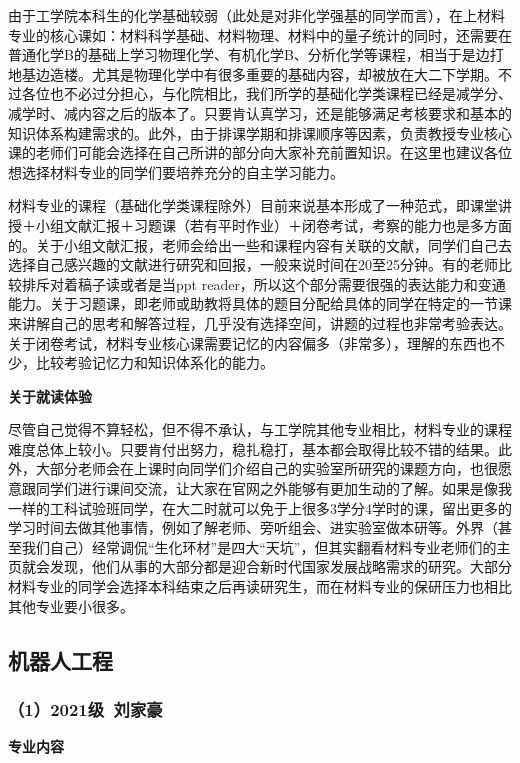 \vspace{10pt}

由于工学院本科生的化学基础较弱（此处是对非化学强基的同学而言），在上材料专业的核心课如：材料科学基础、材料物理、材料中的量子统计的同时，还需要在普通化学B的基础上学习物理化学、有机化学B、分析化学等课程，相当于是边打地基边造楼。尤其是物理化学中有很多重要的基础内容，却被放在大二下学期。不过各位也不必过分担心，与化院相比，我们所学的基础化学类课程已经是减学分、减学时、减内容之后的版本了。只要肯认真学习，还是能够满足考核要求和基本的知识体系构建需求的。此外，由于排课学期和排课顺序等因素，负责教授专业核心课的老师们可能会选择在自己所讲的部分向大家补充前置知识。在这里也建议各位想选择材料专业的同学们要培养充分的自主学习能力。

\vspace{10pt}

材料专业的课程（基础化学类课程除外）目前来说基本形成了一种范式，即课堂讲授＋小组文献汇报＋习题课（若有平时作业）＋闭卷考试，考察的能力也是多方面的。关于小组文献汇报，老师会给出一些和课程内容有关联的文献，同学们自己去选择自己感兴趣的文献进行研究和回报，一般来说时间在20至25分钟。有的老师比较排斥对着稿子读或者是当ppt reader，所以这个部分需要很强的表达能力和变通能力。关于习题课，即老师或助教将具体的题目分配给具体的同学在特定的一节课来讲解自己的思考和解答过程，几乎没有选择空间，讲题的过程也非常考验表达。关于闭卷考试，材料专业核心课需要记忆的内容偏多（非常多），理解的东西也不少，比较考验记忆力和知识体系化的能力。

\vspace{10pt}

\textbf{关于就读体验}

尽管自己觉得不算轻松，但不得不承认，与工学院其他专业相比，材料专业的课程难度总体上较小。只要肯付出努力，稳扎稳打，基本都会取得比较不错的结果。此外，大部分老师会在上课时向同学们介绍自己的实验室所研究的课题方向，也很愿意跟同学们进行课间交流，让大家在官网之外能够有更加生动的了解。如果是像我一样的工科试验班同学，在大二时就可以免于上很多3学分4学时的课，留出更多的学习时间去做其他事情，例如了解老师、旁听组会、进实验室做本研等。外界（甚至我们自己）经常调侃“生化环材”是四大“天坑”，但其实翻看材料专业老师们的主页就会发现，他们从事的大部分都是迎合新时代国家发展战略需求的研究。大部分材料专业的同学会选择本科结束之后再读研究生，而在材料专业的保研压力也相比其他专业要小很多。

\subsection{机器人工程}
\subsubsection{（1）2021级\ 刘家豪}
\textbf{专业内容}

